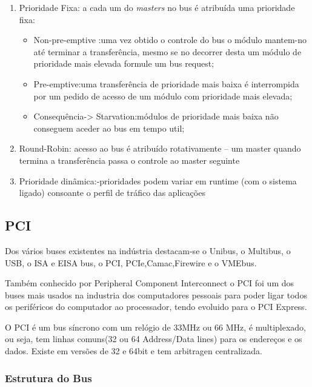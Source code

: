 \documentclass[10pt,a4paper]{paper}
\begin{document}
\begin{enumerate}
 \item Prioridade Fixa: a cada um do \textit{masters} no bus é atribuída uma prioridade fixa:
 	\begin{itemize}
 		\item Non-pre-emptive :uma vez obtido o	controle do	bus	o	módulo mantem-no	
até terminar a	transferência,	mesmo se	no	decorrer desta um	módulo de	
prioridade mais elevada formule um	bus	request;
		\item Pre-emptive:uma transferência de	prioridade mais baixa é interrompida por
um	pedido de	acesso de	um	módulo com	prioridade mais elevada;
		\item Consequência-> Starvation:módulos de	prioridade mais baixa não conseguem aceder
ao bus	em tempo	util;
 	\end{itemize}
	\item Round-Robin: acesso ao bus	é atribuído rotativamente – um	master
quando termina a	transferência passa o	controle ao master seguinte

	\item Prioridade dinâmica:-prioridades podem variar em runtime	 (com	o	
sistema ligado)	consoante o	perfil de	tráfico das	aplicações
\end{enumerate}	
		

	
	\subsection*{PCI}
		Dos vários buses existentes na indústria destacam-se o Unibus, o Multibus, o USB, o ISA e EISA bus, o PCI, PCIe,Camac,Firewire e o VMEbus.
		
	Também conhecido por Peripheral Component Interconnect o PCI foi um dos buses mais usados na industria dos computadores pessoais para poder ligar todos os periféricos do computador ao processador, tendo evoluido para o PCI Express.
	
	O PCI é um bus síncrono com um relógio de 33MHz ou 66 MHz, é multiplexado, ou seja, tem linhas comuns(32 ou 64 Address/Data lines) para os endereços e os dados. Existe em versões de 32 e 64bit e tem arbitragen centralizada.
	 
	
	\subsubsection*{Estrutura do Bus}
	
\end{document}
